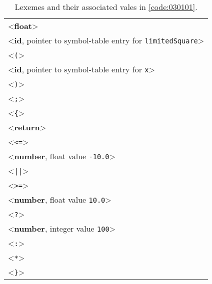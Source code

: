 \begin{table}[!ht]
    \centering
    \begin{tabular}{l}
        <\textbf{float}> \\
        <\textbf{id}, pointer to symbol-table entry for \texttt{limitedSquare}> \\
        <\texttt{(}> \\
        <\textbf{id}, pointer to symbol-table entry for \texttt{x}> \\
        <\texttt{)}> \\
        <\texttt{;}> \\
        <\texttt{\{}> \\
        <\textbf{return}> \\
        <\texttt{<=}> \\
        <\textbf{number}, float value \texttt{-10.0}> \\
        <\texttt{||}> \\
        <\texttt{>=}> \\
        <\textbf{number}, float value \texttt{10.0}> \\
        <\texttt{?}> \\
        <\textbf{number}, integer value \texttt{100}> \\
        <\texttt{:}> \\
        <\texttt{*}> \\
        <\texttt{\}}> \\
    \end{tabular}
    \caption{Lexemes and their associated vales in \cref{code:030101}.}
    \label{tab:030101}
\end{table}